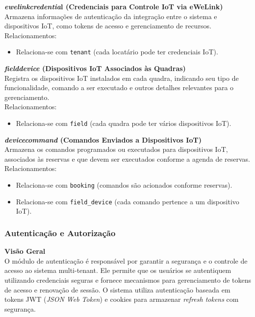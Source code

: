 \noindent\textbf{\textit{ewelink\textunderscore credentia}l (Credenciais para Controle IoT via eWeLink)}\\
Armazena informações de autenticação da integração entre o sistema e dispositivos IoT, como tokens de acesso e gerenciamento de recursos. \\
Relacionamentos: 

\begin{itemize} 
	\item Relaciona-se com \texttt{tenant} (cada locatário pode ter credenciais IoT). 
\end{itemize}


\noindent\textbf{\textit{field\textunderscore device} (Dispositivos IoT Associados às Quadras)}\\
Registra os dispositivos IoT instalados em cada quadra, indicando seu tipo de funcionalidade, comando a ser executado e outros detalhes relevantes para o gerenciamento. \\
Relacionamentos: 

\begin{itemize} 
	\item Relaciona-se com \texttt{field} (cada quadra pode ter vários dispositivos IoT). 
\end{itemize}


\noindent\textbf{\textit{device\textunderscore command} (Comandos Enviados a Dispositivos IoT)}\\
Armazena os comandos programados ou executados para dispositivos IoT, associados às reservas e que devem ser executados conforme a agenda de reservas. \\
Relacionamentos: 

\begin{itemize} 
	\item Relaciona-se com \texttt{booking} (comandos são acionados conforme reservas). 
	\item Relaciona-se com \texttt{field\_device} (cada comando pertence a um dispositivo IoT). 
\end{itemize}

\subsubsection{Autenticação e Autorização}\label{subsubsec:autenticacao_autorizacao}

\noindent\textbf{Visão Geral}\\
O módulo de autenticação é responsável por garantir a segurança e o controle de acesso ao sistema multi-tenant. Ele permite que os usuários se autentiquem utilizando credenciais seguras e fornece mecanismos para gerenciamento de tokens de acesso e renovação de sessão. O sistema utiliza autenticação baseada em tokens JWT (\textit{JSON Web Token}) e cookies para armazenar \textit{refresh tokens} com segurança.

